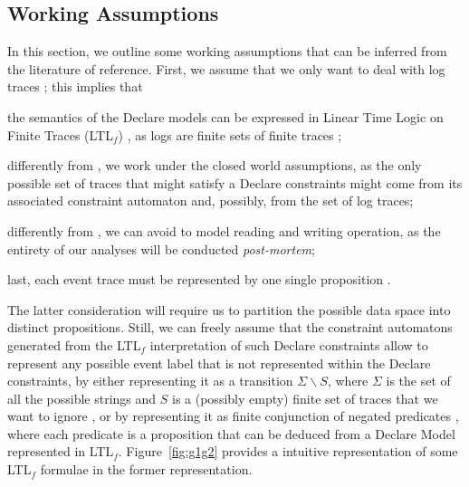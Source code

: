 \subsection{Working Assumptions}\label{sec:wa}
In this section, we outline some working assumptions that can be inferred from the literature of reference. First, we assume that we only want to deal with log traces \cite{XuLZ17a}; this implies that \begin{enumerate*}[label=\emph{\alph*})] \item the semantics of the Declare models can be expressed in Linear Time Logic on Finite Traces (LTL$_f$) \cite{10.1007/978-3-642-40176-3_8}, as logs are finite sets of finite traces \cite{GiacomoV13}; \item differently from \cite{BurattinMS16,MaggiMB19}, we work under the closed world assumptions, as the only possible set of traces that might satisfy a Declare constraints might come from its associated constraint automaton and, possibly, from the set of log traces; \item differently from \cite{MultiPerspective}, we can avoid to model reading and writing operation, as the entirety of our analyses will be conducted \textit{post-mortem}; \item last, each event trace must be represented by one single proposition \cite{XuLZ17a}. \end{enumerate*} The latter consideration will require us to partition the possible data space into distinct propositions. Still, we can freely assume that the constraint automatons generated from the LTL$_f$ interpretation of such Declare constraints allow to represent any possible event label that is not represented within the Declare constraints, by either representing it as a transition $\Sigma\backslash S$, where $\Sigma$ is the set of all the possible strings and $S$ is a (possibly empty) finite set of traces that we want to ignore \cite{LeoniMA12,Westergaard11}, or by representing it as finite conjunction of negated predicates \cite{Lydia}, where each predicate is a proposition that can be deduced from a Declare Model represented in LTL$_f$. Figure~\ref{fig:g1g2} provides a intuitive representation of some LTL$_f$ formulae in the former representation.

